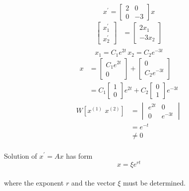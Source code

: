 \documentclass[letterpaper,12pt]{article}
\begin{document}
\[
x^{\prime} = 
    \begin{bmatrix}
        2 & 0\\
        0 & -3
    \end{bmatrix}
    x
\]
\begin{align*}
    \begin{bmatrix}
        x_1^{\prime}\\x_2^{\prime} 
    \end{bmatrix}
        &= 
        \begin{bmatrix}
            2x_1 \\ -3x_2
        \end{bmatrix}\\
\end{align*}
\[
    x_1 = C_1e^{2t}\, x_2 = C_2e^{-3t}
\]
\begin{align*}
    x &= \begin{bmatrix}
        C_1e^{2t}\\0
    \end{bmatrix}+
    \begin{bmatrix}
        0\\C_2e^{-3t}
    \end{bmatrix}
    \\
    &= C_1 \begin{bmatrix}
        1\\0
    \end{bmatrix}e^{2t}
    +C_2 \begin{bmatrix}
        0\\1
    \end{bmatrix}e^{-3t}
\end{align*}
\begin{align*}
    W[x^{(1)} \, \, x^{(2)}] &= 
    \begin{vmatrix}
        e^{2t} & 0\\
        0 & e^{-3t}
    \end{vmatrix}\\
                             &= e^{-t}\\
                             &\ne 0
\end{align*}

\paragraph{}Solution of $x^{\prime} = Ax$ has form
\[
    x = \xi e^{rt}
\]
\paragraph{}where the exponent $r$ and the vector $\xi$ must be determined.
\end{document}
